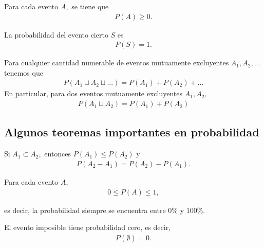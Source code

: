 \begin{axiom}
   Para cada evento $A,$ se tiene que
   \begin{align}
   \label{eq:0.1.1}
    P(A)\geq 0.
   \end{align}

\end{axiom}



\begin{axiom}
   La probabilidad del evento cierto $S$ es
   \begin{align}
   \label{eq:0.1.2}
    P(S)=1.
   \end{align}
\end{axiom}



\begin{axiom}
  Para cualquier cantidad numerable de eventos mutuamente excluyentes
  $A_{1},A_{2},...$ tenemos que
  \begin{align}
   \label{eq:0.1.3}
   P(A_{1}\sqcup A_{2} \sqcup ...)=P(A_{1})+P(A_{2})+...
  \end{align}
En particular, para dos eventos mutuamente excluyentes $A_{1},A_{2},$
\begin{align}
	\label{eq:0.1.4}
 P(A_{1}\sqcup A_{2})=P(A_{1})+P(A_{2})
\end{align}

\end{axiom}


\subsection{Algunos teoremas importantes en probabilidad}
{}
	\begin{thm}
	 \label{thm:0.1.1}
	 Si $A_{1}\subset A_{2},$ entonces $P(A_{1})\leq P(A_{2})$ y
	 \begin{align*}
		P(A_{2}-A_{1})=P(A_{2})-P(A_{1}).
\end{align*}
	\end{thm}


{}
\begin{thm}
 \label{thm:0.1.2}
 Para cada evento $A$,
 \begin{align}
  \label{eq:0.1.5}
  0\leq P(A) \leq 1,
 \end{align}

es decir, la probabilidad siempre se encuentra entre $0\%$ y $100\%.$
\end{thm}


\begin{thm}
	\label{thm:0.1.3}
 El evento imposible tiene probabilidad cero, es decir,
 \begin{align}
  P(\emptyset)=0.
 \end{align}
\end{thm}


